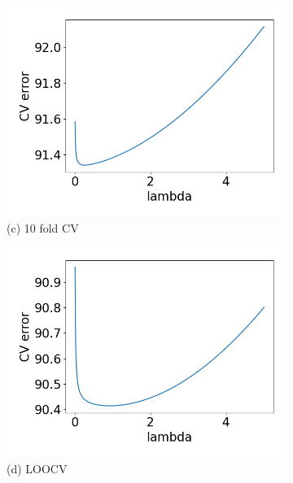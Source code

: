 \begin{figure}[t!]
\begin{subfigure}[b]{.24\columnwidth}
    \includegraphics[width=\columnwidth]{../fig/collinear_10fold_obj_81.png}
    \caption{(c) 10 fold CV}
\end{subfigure}
\hfill
\centering
\begin{subfigure}[b]{.24\columnwidth} 
    \includegraphics[width=\columnwidth]{../fig/collinear_loocv_obj_81.png}
    \caption{(d) LOOCV}
\end{subfigure}
\hfill
\centering
\begin{subfigure}[b]{.24\columnwidth} 

\end{subfigure}
\end{figure}
